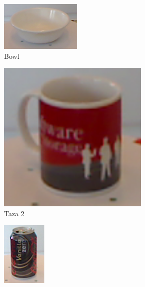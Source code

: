 \begin{figure}[t]
    \quad
    \begin{subfigure}[b]{0.4\textwidth}
		\centering
        \includegraphics[width=\textwidth]{img/base_rgbd/bowl.png}
        \caption{Bowl}
		\label{fig:bowl}
    \end{subfigure}
	\quad
    \begin{subfigure}[b]{0.4\textwidth}
		\centering
        \includegraphics[width=0.8\textwidth]{img/base_rgbd/taza2.png}
        \caption{Taza 2}
		\label{fig:taza2}
    \end{subfigure}
	\quad
    \begin{subfigure}[b]{0.4\textwidth}
		\centering
        \includegraphics[scale=1.25]{img/base_rgbd/lata.png}

\end{subfigure}
\end{figure}
